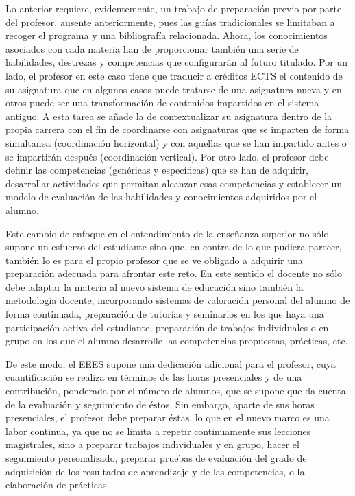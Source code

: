 Lo anterior requiere, evidentemente, un trabajo de preparación previo por parte del profesor, ausente anteriormente, pues las guías tradicionales se limitaban a recoger el programa y una bibliografía relacionada. Ahora, los conocimientos asociados con cada materia han de proporcionar también una serie de habilidades, destrezas y competencias que configurarán al futuro titulado. Por un lado, el profesor en este caso tiene que traducir a créditos ECTS el contenido de su asignatura que en algunos casos puede tratarse de una asignatura nueva y en otros puede ser una transformación de contenidos impartidos en el sistema antiguo. A esta tarea se añade la de contextualizar su asignatura dentro de la propia carrera con el fin de coordinarse con asignaturas que se imparten de forma simultanea (coordinación horizontal) y con aquellas que se han impartido antes o se impartirán después (coordinación vertical). Por otro lado, el profesor debe definir las competencias (genéricas y específicas) que se han de adquirir, desarrollar actividades que permitan alcanzar esas competencias y establecer un modelo de evaluación de las habilidades y conocimientos adquiridos por el alumno.

Este cambio de enfoque en el entendimiento de la enseñanza superior no sólo supone un esfuerzo del estudiante sino que, en contra de lo que pudiera parecer, también lo es para el propio profesor que se ve obligado a adquirir una preparación adecuada para afrontar este reto. En este sentido el docente no sólo debe adaptar la materia al nuevo sistema de educación sino también la metodología docente, incorporando sistemas de valoración personal del alumno de forma continuada, preparación de tutorías y seminarios en los que haya una participación activa del estudiante, preparación de trabajos individuales o en grupo en los que el alumno desarrolle las competencias propuestas, prácticas, etc.

De este modo, el EEES supone una dedicación adicional para el profesor, cuya cuantificación se realiza en términos de las horas presenciales y de una contribución, ponderada por el número de alumnos, que se supone que da cuenta de la evaluación y seguimiento de éstos. Sin embargo, aparte de sus horas presenciales, el profesor debe preparar éstas, lo que en el nuevo marco es una labor continua, ya que no se limita a repetir continuamente sus lecciones magistrales, sino a preparar trabajos individuales y en grupo, hacer el seguimiento personalizado, preparar pruebas de evaluación del grado de adquisición de los resultados de aprendizaje y de las competencias, o la elaboración de prácticas. 

